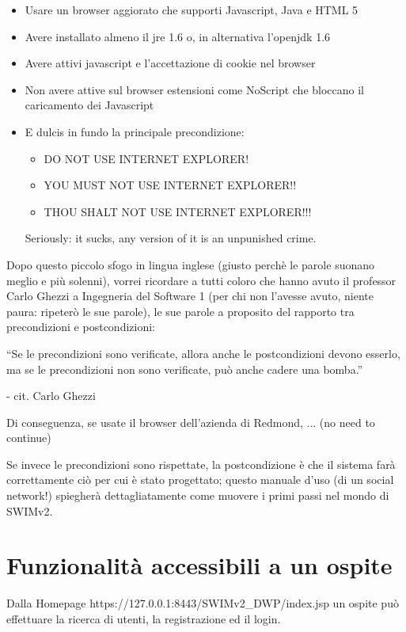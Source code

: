 \documentclass[a4paper,12pt]{article}
\begin{document}
\begin{itemize}
 \item Usare un browser aggiorato che supporti Javascript, Java e HTML 5
 \item Avere installato almeno il jre 1.6 o, in alternativa l'openjdk 1.6
 \item Avere attivi javascript e l'accettazione di cookie nel browser
 \item Non avere attive sul browser estensioni come NoScript che bloccano il caricamento dei Javascript
 \item E dulcis in fundo la principale precondizione:
 \begin{itemize}
  \item DO NOT USE INTERNET EXPLORER!
  \item YOU MUST NOT USE INTERNET EXPLORER!!
  \item THOU SHALT NOT USE INTERNET EXPLORER!!!
 \end{itemize}
 Seriously: it sucks, any version of it is an unpunished crime.
\end{itemize}
Dopo questo piccolo sfogo in lingua inglese (giusto perchè le parole suonano meglio e più solenni), vorrei ricordare a tutti coloro che hanno avuto il professor Carlo Ghezzi a Ingegneria del Software 1 (per chi non l'avesse avuto, niente paura: ripeterò le
sue parole), le sue parole a proposito del rapporto tra precondizioni e postcondizioni: \linebreak

``Se le precondizioni sono verificate, allora anche le postcondizioni devono esserlo, ma se le precondizioni non sono verificate, può anche cadere una bomba.'' 
\linebreak

- cit. Carlo Ghezzi


\vspace{0.5cm}
Di conseguenza, se usate il browser dell'azienda di Redmond, ... (no need to continue)

Se invece le precondizioni sono rispettate, la postcondizione è che il sistema farà correttamente ciò per cui è stato progettato; questo manuale d'uso (di un social network!) spiegherà dettagliatamente come
muovere i primi passi nel mondo di SWIMv2.

\pagebreak

\section{Funzionalità accessibili a un ospite}
Dalla Homepage https://127.0.0.1:8443/SWIMv2\_DWP/index.jsp un ospite può effettuare la ricerca di utenti, la registrazione ed il login.
\end{document}
